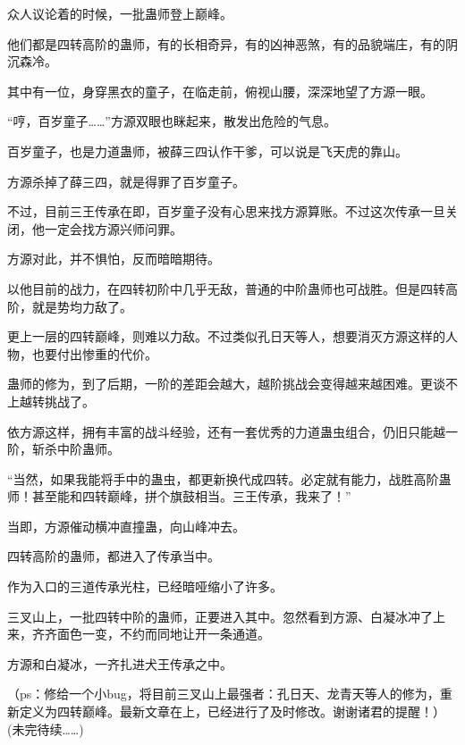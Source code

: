 \begin{this_body}
众人议论着的时候，一批蛊师登上巅峰。

他们都是四转高阶的蛊师，有的长相奇异，有的凶神恶煞，有的品貌端庄，有的阴沉森冷。

其中有一位，身穿黑衣的童子，在临走前，俯视山腰，深深地望了方源一眼。

“哼，百岁童子……”方源双眼也眯起来，散发出危险的气息。

百岁童子，也是力道蛊师，被薛三四认作干爹，可以说是飞天虎的靠山。

方源杀掉了薛三四，就是得罪了百岁童子。

不过，目前三王传承在即，百岁童子没有心思来找方源算账。不过这次传承一旦关闭，他一定会找方源兴师问罪。

方源对此，并不惧怕，反而暗暗期待。

以他目前的战力，在四转初阶中几乎无敌，普通的中阶蛊师也可战胜。但是四转高阶，就是势均力敌了。

更上一层的四转巅峰，则难以力敌。不过类似孔日天等人，想要消灭方源这样的人物，也要付出惨重的代价。

蛊师的修为，到了后期，一阶的差距会越大，越阶挑战会变得越来越困难。更谈不上越转挑战了。

依方源这样，拥有丰富的战斗经验，还有一套优秀的力道蛊虫组合，仍旧只能越一阶，斩杀中阶蛊师。

“当然，如果我能将手中的蛊虫，都更新换代成四转。必定就有能力，战胜高阶蛊师！甚至能和四转巅峰，拼个旗鼓相当。三王传承，我来了！”

当即，方源催动横冲直撞蛊，向山峰冲去。

四转高阶的蛊师，都进入了传承当中。

作为入口的三道传承光柱，已经暗哑缩小了许多。

三叉山上，一批四转中阶的蛊师，正要进入其中。忽然看到方源、白凝冰冲了上来，齐齐面色一变，不约而同地让开一条通道。

方源和白凝冰，一齐扎进犬王传承之中。

（ps：修给一个小bug，将目前三叉山上最强者：孔日天、龙青天等人的修为，重新定义为四转巅峰。最新文章在上，已经进行了及时修改。谢谢诸君的提醒！）(未完待续……)

\end{this_body}

